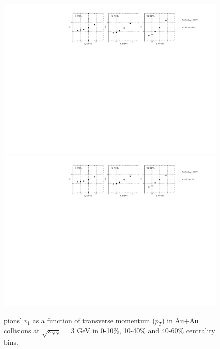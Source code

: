 \begin{figure}[h]
\includegraphics[scale=0.5]{chapter3/fig/v1ptpikp/pionp_v1pt_wide_cent.pdf}
\includegraphics[scale=0.5]{chapter3/fig/v1ptpikp/pionm_v1pt_wide_cent.pdf}
\caption{pions' $v_{1}$ as a function of transverse momentum ($p_{T}$) in Au+Au collisions at $\sqrt{s_{NN}}$ = 3 GeV in 0-10\%, 10-40\% and 40-60\% centrality bins.}
\label{pion_v1pt_widecent}
\end{figure}

\clearpage

